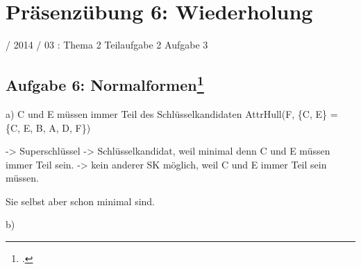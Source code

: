 \documentclass{lehramt-informatik-haupt}
\begin{document}
\chapter{Präsenzübung 6: Wiederholung}

 / 2014 / 03 : Thema 2 Teilaufgabe 2 Aufgabe 3

\section{Aufgabe 6: Normalformen\footcite{db:pu:wh}}

a) C und E müssen immer Teil des Schlüsselkandidaten
AttrHull(F, \{C, E\} = \{C, E, B, A, D, F\})

-> Superschlüssel
-> Schlüsselkandidat, weil minimal denn C und E müssen immer Teil sein.
-> kein anderer SK möglich, weil C und E immer Teil sein müssen.

Sie selbst aber schon minimal sind.

b)

\literatur
\end{document}
